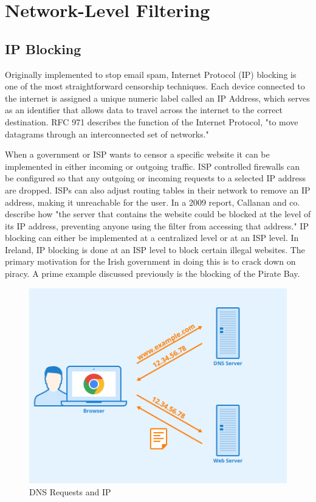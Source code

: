 \section{Network-Level Filtering}
\subsection{IP Blocking}
Originally implemented to stop email spam, Internet Protocol (IP) blocking is one of the most straightforward censorship techniques. Each device connected to the internet is assigned a unique numeric label called an IP Address, which serves as an identifier that allows data to travel across the internet to the correct destination. RFC 971 describes the function of the Internet Protocol, "to move datagrams through an interconnected set of networks." \cite{rfc791}

When a government or ISP wants to censor a specific website it can be implemented in either incoming or outgoing traffic. ISP controlled firewalls can be configured so that any outgoing or incoming requests to a selected IP address are dropped. ISPs can also adjust routing tables in their network to remove an IP address, making it unreachable for the user. In a 2009 report, Callanan and co. describe how "the server that contains the website could be blocked at the level of its IP address, preventing anyone using the filter from accessing that address." \cite{inthemis2025internet} IP blocking can either be implemented at a centralized level or at an ISP level. In Ireland, IP blocking is done at an ISP level to block certain illegal websites. The primary motivation for the Irish government in doing this is to crack down on piracy. A prime example discussed previously is the blocking of the Pirate Bay. \cite{piratebay_block2013}

\begin{figure}
    \centering
    \includegraphics[width=0.5\linewidth]{State of the Art/DNS.png}
    \caption{DNS Requests and IP}
    \label{fig:enter-label}
\end{figure}






